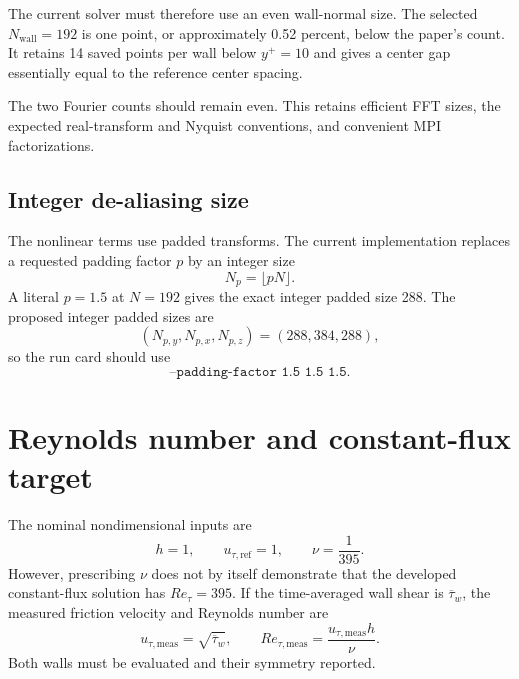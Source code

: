 \documentclass[11pt]{article}
\begin{document}
The current solver must therefore use an even wall-normal size.  The selected
$N_{\mathrm{wall}}=192$ is one point, or approximately 0.52 percent, below
the paper's count.  It retains 14 saved points per wall below $y^+=10$ and
gives a center gap essentially equal to the reference center spacing.

The two Fourier counts should remain even.  This retains efficient FFT sizes,
the expected real-transform and Nyquist conventions, and convenient MPI
factorizations.

\subsection{Integer de-aliasing size}

The nonlinear terms use padded transforms.  The current implementation
replaces a requested padding factor $p$ by an integer size
\[
  N_p=\lfloor pN\rfloor.
\]
A literal $p=1.5$ at $N=192$ gives the exact integer padded size 288.  The proposed
integer padded sizes are
\begin{equation}
  (N_{p,y},N_{p,x},N_{p,z})=(288,384,288),
  \label{eq:padded_sizes}
\end{equation}
so the run card should use
\begin{equation}
  \texttt{--padding-factor 1.5 1.5 1.5}.
  \label{eq:padding_factors}
\end{equation}

\section{Reynolds number and constant-flux target}

The nominal nondimensional inputs are
\begin{equation}
  h=1,\qquad u_{\tau,\mathrm{ref}}=1,\qquad
  \nu=\frac{1}{395}.
  \label{eq:viscosity}
\end{equation}
However, prescribing $\nu$ does not by itself demonstrate that the developed
constant-flux solution has $Re_{\tau}=395$.  If the time-averaged wall shear is
$\overline{\tau}_w$, the measured friction velocity and Reynolds number are
\begin{equation}
  u_{\tau,\mathrm{meas}}=\sqrt{\overline{\tau}_w},\qquad
  Re_{\tau,\mathrm{meas}}
  =\frac{u_{\tau,\mathrm{meas}}h}{\nu}.
  \label{eq:measured_retau}
\end{equation}
Both walls must be evaluated and their symmetry reported.
\end{document}
